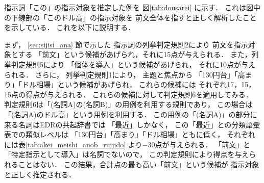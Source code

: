 指示詞「この」の指示対象を推定した例を
図\ref{tab:dousarei} に示す．
これは図中の下線部の「このドル高」の指示対象を
前文全体を指すと正しく解析したことを示している．
これを以下に説明する．

まず，
\ref{sec:sijisi_ana} 節で示した
指示詞の列挙判定規則2により
前文を指示対象とする
「前文」という候補があげられ，それに15点が与えられる．
また，列挙判定規則5により
「個体を導入」という候補があげられ，
それに10点が与えられる．
さらに，
列挙判定規則1により，
主題と焦点から
「130円台」「高まり」「ドル相場」という候補があげられ，
これらの候補には
それぞれ17，15，15点の得点が与えられる．
これらの候補に対して判定規則6を適用してみる．
判定規則6は「(名詞A)の(名詞B)」の用例を利用する規則であり，
この場合は「(名詞A)のドル高」という用例を利用する．
この用例の「(名詞A)」の部分に来る名詞はEDRの共起辞書では
「最近」しかなく，
この「最近」との分類語彙表での類似レベルは
「130円台」「高まり」「ドル相場」ともに低く，
それぞれには表\ref{tab:akei_meishi_anob_ruijido} より$-30$点が与えられる．
「前文」と「特定指示として導入」は名詞でないので，
この判定規則により得点を与えられることはない．
この結果，合計点の最も高い「前文」という候補が
指示対象と正しく推定される．

\begin{table*}[t]

    \caption{本研究の実験結果}
    \label{tab:sougoukekka}

\end{table*}

